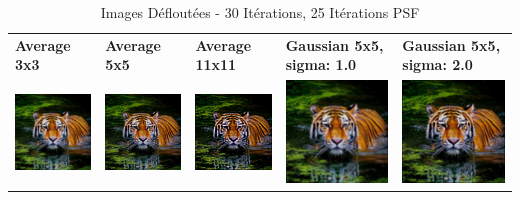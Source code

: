 \begin{table}[h!]
    \centering
    \captionsetup{justification=centering}
    \caption*{Images Défloutées - 30 Itérations, 25 Itérations PSF}
    \begin{tabular}{>{\centering\arraybackslash}m{3cm} >{\centering\arraybackslash}m{3cm} >{\centering\arraybackslash}m{3cm} >{\centering\arraybackslash}m{3cm} >{\centering\arraybackslash}m{3cm}}
        \textbf{Average 3x3}                                                                                                    & \textbf{Average 5x5} & \textbf{Average 11x11} & \textbf{Gaussian 5x5, sigma: 1.0} & \textbf{Gaussian 5x5, sigma: 2.0} \\
        \includegraphics[width=3cm]{images/blind_processed/tiger/average_3x3/tiger_unblurred_30-iter_25-psf-iter.png}           &
        \includegraphics[width=3cm]{images/blind_processed/tiger/average_5x5/tiger_unblurred_30-iter_25-psf-iter.png}           &
        \includegraphics[width=3cm]{images/blind_processed/tiger/average_11x11/tiger_unblurred_30-iter_25-psf-iter.png}         &
        \includegraphics[width=3cm]{images/blind_processed/tiger/gaussian_5x5_sigma1.0/tiger_unblurred_30-iter_25-psf-iter.png} &
        \includegraphics[width=3cm]{images/blind_processed/tiger/gaussian_5x5_sigma2.0/tiger_unblurred_30-iter_25-psf-iter.png}                                                                                                                         \\
    \end{tabular}
\end{table}

